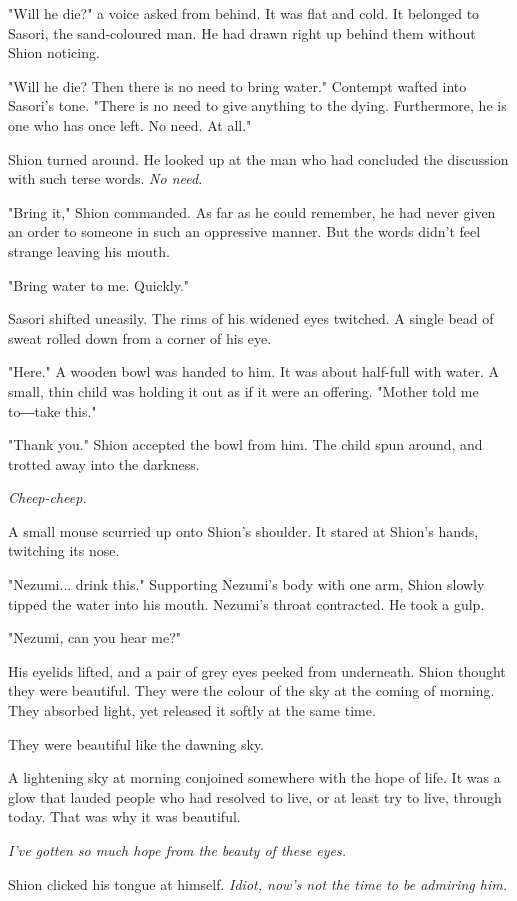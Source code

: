 "Will he die?" a voice asked from behind. It was flat and cold. It
belonged to Sasori, the sand-coloured man. He had drawn right up behind
them without Shion noticing.

"Will he die? Then there is no need to bring water." Contempt wafted
into Sasori's tone. "There is no need to give anything to the dying.
Furthermore, he is one who has once left. No need. At all."

Shion turned around. He looked up at the man who had concluded the
discussion with such terse words. \emph{No need.}

"Bring it," Shion commanded. As far as he could remember, he had never
given an order to someone in such an oppressive manner. But the words
didn't feel strange leaving his mouth.

"Bring water to me. Quickly."

Sasori shifted uneasily. The rims of his widened eyes twitched. A single
bead of sweat rolled down from a corner of his eye.

"Here." A wooden bowl was handed to him. It was about half-full with
water. A small, thin child was holding it out as if it were an offering.
"Mother told me to―take this."

"Thank you." Shion accepted the bowl from him. The child spun around,
and trotted away into the darkness.

\emph{Cheep-cheep.}

A small mouse scurried up onto Shion's shoulder. It stared at Shion's
hands, twitching its nose.

"Nezumi... drink this." Supporting Nezumi's body with one arm, Shion
slowly tipped the water into his mouth. Nezumi's throat contracted. He
took a gulp.

"Nezumi, can you hear me?"

His eyelids lifted, and a pair of grey eyes peeked from underneath.
Shion thought they were beautiful. They were the colour of the sky at
the coming of morning. They absorbed light, yet released it softly at
the same time.

They were beautiful like the dawning sky.

A lightening sky at morning conjoined somewhere with the hope of life.
It was a glow that lauded people who had resolved to live, or at least
try to live, through today. That was why it was beautiful.

\emph{I've gotten so much hope from the beauty of these eyes.}

Shion clicked his tongue at himself. \emph{Idiot, now's not the time to be
	admiring him.}

